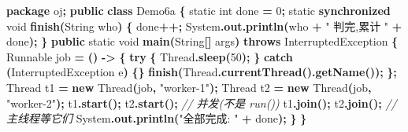 \documentclass[
  11pt,
]{ctexart}
\newenvironment{Shaded}{\begin{snugshade}}{\end{snugshade}}
\newcommand{\BuiltInTok}[1]{#1}
\newcommand{\CommentTok}[1]{\textcolor[rgb]{0.56,0.35,0.01}{\textit{#1}}}
\newcommand{\ControlFlowTok}[1]{\textcolor[rgb]{0.13,0.29,0.53}{\textbf{#1}}}
\newcommand{\DataTypeTok}[1]{\textcolor[rgb]{0.13,0.29,0.53}{#1}}
\newcommand{\DecValTok}[1]{\textcolor[rgb]{0.00,0.00,0.81}{#1}}
\newcommand{\FunctionTok}[1]{\textcolor[rgb]{0.13,0.29,0.53}{\textbf{#1}}}
\newcommand{\ImportTok}[1]{#1}
\newcommand{\KeywordTok}[1]{\textcolor[rgb]{0.13,0.29,0.53}{\textbf{#1}}}
\newcommand{\NormalTok}[1]{#1}
\newcommand{\OperatorTok}[1]{\textcolor[rgb]{0.81,0.36,0.00}{\textbf{#1}}}
\newcommand{\StringTok}[1]{\textcolor[rgb]{0.31,0.60,0.02}{#1}}
\begin{document}
\begin{Shaded}
\begin{Highlighting}[]
\KeywordTok{package}\ImportTok{ oj}\OperatorTok{;}
\KeywordTok{public} \KeywordTok{class}\NormalTok{ Demo6a }\OperatorTok{\{}
    \DataTypeTok{static} \DataTypeTok{int}\NormalTok{ done }\OperatorTok{=} \DecValTok{0}\OperatorTok{;}
    \DataTypeTok{static} \KeywordTok{synchronized} \DataTypeTok{void} \FunctionTok{finish}\OperatorTok{(}\BuiltInTok{String}\NormalTok{ who}\OperatorTok{)} \OperatorTok{\{}\NormalTok{ done}\OperatorTok{++;} \BuiltInTok{System}\OperatorTok{.}\FunctionTok{out}\OperatorTok{.}\FunctionTok{println}\OperatorTok{(}\NormalTok{who }\OperatorTok{+} \StringTok{" 判完,累计 "} \OperatorTok{+}\NormalTok{ done}\OperatorTok{);} \OperatorTok{\}}
    \KeywordTok{public} \DataTypeTok{static} \DataTypeTok{void} \FunctionTok{main}\OperatorTok{(}\BuiltInTok{String}\OperatorTok{[]}\NormalTok{ args}\OperatorTok{)} \KeywordTok{throws} \BuiltInTok{InterruptedException} \OperatorTok{\{}
        \BuiltInTok{Runnable}\NormalTok{ job }\OperatorTok{=} \OperatorTok{()} \OperatorTok{{-}\textgreater{}} \OperatorTok{\{} \ControlFlowTok{try} \OperatorTok{\{} \BuiltInTok{Thread}\OperatorTok{.}\FunctionTok{sleep}\OperatorTok{(}\DecValTok{50}\OperatorTok{);} \OperatorTok{\}} \ControlFlowTok{catch} \OperatorTok{(}\BuiltInTok{InterruptedException}\NormalTok{ e}\OperatorTok{)} \OperatorTok{\{\}} \FunctionTok{finish}\OperatorTok{(}\BuiltInTok{Thread}\OperatorTok{.}\FunctionTok{currentThread}\OperatorTok{().}\FunctionTok{getName}\OperatorTok{());} \OperatorTok{\};}
        \BuiltInTok{Thread}\NormalTok{ t1 }\OperatorTok{=} \KeywordTok{new} \BuiltInTok{Thread}\OperatorTok{(}\NormalTok{job}\OperatorTok{,} \StringTok{"worker{-}1"}\OperatorTok{);}
        \BuiltInTok{Thread}\NormalTok{ t2 }\OperatorTok{=} \KeywordTok{new} \BuiltInTok{Thread}\OperatorTok{(}\NormalTok{job}\OperatorTok{,} \StringTok{"worker{-}2"}\OperatorTok{);}
\NormalTok{        t1}\OperatorTok{.}\FunctionTok{start}\OperatorTok{();}\NormalTok{ t2}\OperatorTok{.}\FunctionTok{start}\OperatorTok{();}                              \CommentTok{// 并发(不是 run())}
\NormalTok{        t1}\OperatorTok{.}\FunctionTok{join}\OperatorTok{();}\NormalTok{  t2}\OperatorTok{.}\FunctionTok{join}\OperatorTok{();}                                \CommentTok{// 主线程等它们}
        \BuiltInTok{System}\OperatorTok{.}\FunctionTok{out}\OperatorTok{.}\FunctionTok{println}\OperatorTok{(}\StringTok{"全部完成: "} \OperatorTok{+}\NormalTok{ done}\OperatorTok{);}
    \OperatorTok{\}}
\OperatorTok{\}}
\end{Highlighting}
\end{Shaded}
\end{document}
